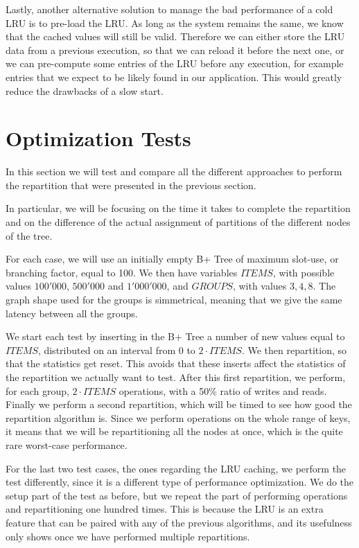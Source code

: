 Lastly, another alternative solution to manage the bad performance of a cold LRU is to pre-load the LRU. As long as the system remains the same, we know that the cached values will still be valid. Therefore we can either store the LRU data from a previous execution, so that we can reload it before the next one, or we can pre-compute some entries of the LRU before any execution, for example entries that we expect to be likely found in our application. This would greatly reduce the drawbacks of a slow start.

\section{Optimization Tests}\label{sec:optimization-tests}
In this section we will test and compare all the different approaches to perform the repartition that were presented in the previous section.

In particular, we will be focusing on the time it takes to complete the repartition and on the difference of the actual assignment of partitions of the different nodes of the tree.

For each case, we will use an initially empty B+ Tree of maximum slot-use, or branching factor, equal to 100. We then have variables $ITEMS$, with possible values $100'000$, $500'000$ and $1'000'000$, and $GROUPS$, with values $3, 4, 8$. The graph shape used for the groups is simmetrical, meaning that we give the same latency between all the groups.

We start each test by inserting in the B+ Tree a number of new values equal to $ITEMS$, distributed on an interval from 0 to $2\cdot ITEMS$. We then repartition, so that the statistics get reset. This avoids that these inserts affect the statistics of the repartition we actually want to test. After this first repartition, we perform, for each group, $2\cdot ITEMS$ operations, with a 50\% ratio of writes and reads. Finally we perform a second repartition, which will be timed to see how good the repartition algorithm is. Since we perform operations on the whole range of keys, it means that we will be repartitioning all the nodes at once, which is the quite rare worst-case performance.

For the last two test cases, the ones regarding the LRU caching, we perform the test differently, since it is a different type of performance optimization. We do the setup part of the test as before, but we repeat the part of performing operations and repartitioning one hundred times. This is because the LRU is an extra feature that can be paired with any of the previous algorithms, and its usefulness only shows once we have performed multiple repartitions.

